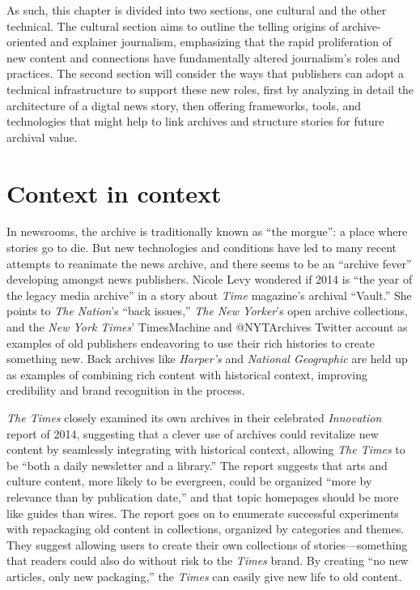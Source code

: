 As such, this chapter is divided into two sections, one cultural and the other technical. The cultural section aims to outline the telling origins of archive-oriented and explainer journalism, emphasizing that the rapid proliferation of new content and connections have fundamentally altered journalism's roles and practices. The second section will consider the ways that publishers can adopt a technical infrastructure to support these new roles, first by analyzing in detail the architecture of a digtal news story, then offering frameworks, tools, and technologies that might help to link archives and structure stories for future archival value.

\section{Context in context}

In newsrooms, the archive is traditionally known as ``the morgue'': a place where stories go to die. But new technologies and conditions have led to many recent attempts to reanimate the news archive, and there seems to be an ``archive fever'' developing amongst news publishers. Nicole Levy wondered if 2014 is ``the year of the legacy media archive'' in a story about \emph{Time} magazine's archival ``Vault.''\autocite{levy_time.com_2014} She points to \emph{The Nation}'s ``back issues,'' \emph{The New Yorker}'s open archive collections, and the \emph{New York Times}' TimesMachine and @NYTArchives Twitter account as examples of old publishers endeavoring to use their rich histories to create something new. Back archives like \emph{Harper's} and \emph{National Geographic} are held up as examples of combining rich content with historical context, improving credibility and brand recognition in the process.

\emph{The Times} closely examined its own archives in their celebrated \emph{Innovation} report of 2014, suggesting that a clever use of archives could revitalize new content by seamlessly integrating with historical context, allowing \emph{The Times} to be ``both a daily newsletter and a library.''\autocite[28]{_innovation_2014} The report suggests that arts and culture content, more likely to be evergreen, could be organized ``more by relevance than by publication date,'' and that topic homepages should be more like guides than wires.\autocite[29-30]{_innovation_2014} The report goes on to enumerate successful experiments with repackaging old content in collections, organized by categories and themes. They suggest allowing users to create their own collections of stories---something that readers could also do without risk to the \emph{Times} brand. By creating ``no new articles, only new packaging,'' the \emph{Times} can easily give new life to old content.\autocite[34]{_innovation_2014}

